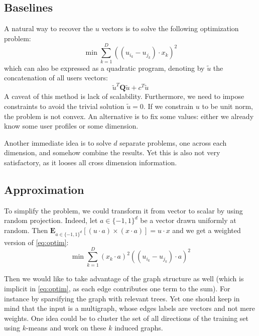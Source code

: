\subsection{Baselines}
A natural way to recover the $u$ vectors is to solve the following
optimization problem:
\begin{equation}
	\min \sum_{k=1}^D \left( (u_{i_k} - u_{j_k} ) \cdot x_k \right )^2
	\label{eq:optim}
\end{equation}
which can also be expressed as a quadratic program, denoting by $\tilde{u}$ the
concatenation of all users vectors:
\begin{equation*}
	\tilde{u}^T \mathbf{Q} \tilde{u} + c^T \tilde{u}
\end{equation*}
A caveat of this method is lack of scalability. Furthermore, we need to impose
constraints to avoid the trivial solution $\tilde{u} = 0$. If we constrain $u$
to be unit norm, the problem is not convex. An alternative is to fix some
values: either we already know some user profiles or some dimension.

Another immediate idea is to solve $d$ separate problems, one across each
dimension, and somehow combine the results. Yet this is also not very
satisfactory, as it looses all cross dimension information.

\subsection{Approximation}

To simplify the problem, we could transform it from vector to scalar by using
random projection. Indeed, let $a \in \{-1,1\}^d$ be a vector drawn uniformly
at random. Then $\mathbf{E}_{a \in \{-1,1\}^d}\left[(u\cdot a)\times (x \cdot
a)\right] = u\cdot x$ and we get a weighted version of \eqref{eq:optim}:
\begin{equation*}
	\min \sum_{k=1}^D (x_k\cdot a)^2 \left( (u_{i_k} - u_{j_k} ) \cdot a \right )^2
	\label{eq:random-optim}
\end{equation*}

Then we would like to take advantage of the graph structure as well (which is
implicit in \eqref{eq:optim}, as each edge contributes one term to the sum).
For instance by sparsifying the graph with relevant trees. Yet one should keep
in mind that the input is a multigraph, whose edges labels are vectors and not
mere weights. One idea could be to cluster the set of all directions of the
training set using $k$-means and work on these $k$ induced graphs.

